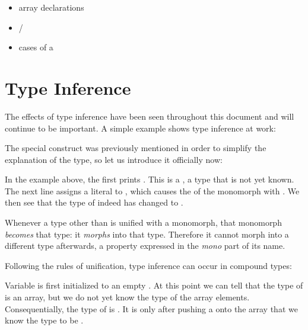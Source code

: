 \documentclass{haxe}
\begin{document}
\begin{itemize}
	\item array declarations
	\item {}/
	\item cases of a 
\end{itemize}




\section{Type Inference}
\label{type-system-type-inference}

The effects of type inference have been seen throughout this document and will continue to be important. A simple example shows type inference at work:

The special construct  was previously mentioned in order to simplify the explanation of the  type, so let us introduce it officially now:


In the example above, the first  prints . This is a , a type that is not yet known. The next line  assigns a  literal to , which causes the  of the monomorph with . We then see that the type of  indeed has changed to .

Whenever a type other than  is unified with a monomorph, that monomorph \emph{becomes} that type: it \emph{morphs} into that type. Therefore it cannot morph into a different type afterwards, a property expressed in the \emph{mono} part of its name.

Following the rules of unification, type inference can occur in compound types:

Variable  is first initialized to an empty . At this point we can tell that the type of  is an array, but we do not yet know the type of the array elements. Consequentially, the type of  is . It is only after pushing a  onto the array that we know the type to be .
\end{document}
